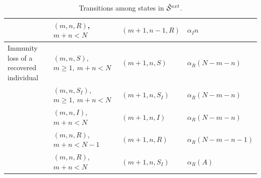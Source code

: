 \documentclass[10pt,A4paper]{article}
\begin{document}
\begin{table}[h]
\begin{tabular}{|l|l|l|l|}
 & $(m,n,R)$, $m+n<N$ & $(m+1,n-1,R)$ & $\alpha_I n$\\
\hline
Immunity loss of a recovered individual & $(m,n,S)$, $m\geq1,\ m+n<N$ & $(m+1,n,S)$ & $\alpha_R (N-m-n)$\\
 & $(m,n,S_I)$, $m\geq1,\ m+n<N$ & $(m+1,n,S_I)$ & $\alpha_R (N-m-n)$\\
 & $(m,n,I)$, $m+n<N$ & $(m+1,n,I)$ & $\alpha_R (N-m-n)$\\
 & $(m,n,R)$, $m+n<N-1$ & $(m+1,n,R)$ & $\alpha_R (N-m-n-1)$\\
 & $(m,n,R)$, $m+n<N$ & $(m+1,n,S_I)$ & $\alpha_R(A)$\\
\hline
\end{tabular}
\caption{Transitions among states in ${\cal \tilde S}^{ext}$.}
\label{tab:2}
\end{table}
\end{document}
